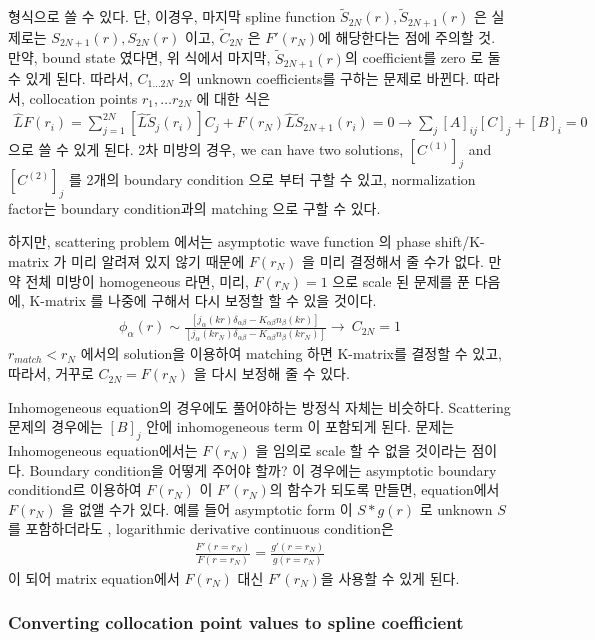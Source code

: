 \documentclass[10pt]{article}
\newcommand{\bea}{\begin{eqnarray}}
\newcommand{\eea}{\end{eqnarray}}
\begin{document}
형식으로 쓸 수 있다. 단, 이경우, 마지막 
spline function
$\tilde{S}_{2N}(r), \tilde{S}_{2N+1}(r)$ 은 
실제로는 $S_{2N+1}(r), S_{2N}(r)$ 이고,
$\tilde{C}_{2N}$ 은 $F'(r_N)$에 해당한다는 점에 주의할 것. 만약, bound state
였다면, 위 식에서 마지막, $\tilde{S}_{2N+1}(r)$의 coefficient를 zero
로 둘 수 있게 된다. 따라서, $C_{1\dots 2N}$ 의 unknown
coefficients를 구하는 문제로 바뀐다.
따라서, collocation points $r_1,\dots r_{2N}$ 에 대한 식은
\bea
\hat{L}F(r_i)=\sum_{j=1}^{2N}[\hat{L}\tilde{S}_j(r_i)]C_j
              +F(r_N)\hat{L}\tilde{S}_{2N+1}(r_i)=0
\to \sum_j [A]_{ij}[C]_j +[B]_i=0  
\eea
으로 쓸 수 있게 된다. 2차 미방의 경우, we can have two solutions,
$[C^{(1)}]_j$ and $[C^{(2)}]_j$ 를 2개의 boundary condition
으로 부터 구할 수 있고, normalization factor는 boundary condition과의
matching 으로 구할 수 있다.

하지만, scattering problem 에서는 asymptotic wave function 
의  phase shift/K-matrix 가
미리 알려져 있지 않기 때문에 $F(r_N)$ 을 미리 결정해서 줄 수가 없다. 
만약 전체 미방이 homogeneous 라면, 미리, $F(r_N)=1$ 으로
scale 된 문제를 푼 다음에, K-matrix 를 나중에 구해서 다시 보정할 할 수 있을 것이다. 
\bea
\phi_{\alpha}(r)\sim \frac{[j_\alpha(kr)\delta_{\alpha\beta}
                    -K_{\alpha\beta} n_\beta(kr)]}
                    {[j_\alpha(kr_N)\delta_{\alpha\beta}
                    -K_{\alpha\beta} n_\beta(kr_N)]}
                    \to\ C_{2N}=1
\eea
$r_{match}<r_N$ 에서의 solution을 이용하여 matching 
하면 K-matrix를 결정할 수 있고, 따라서, 거꾸로 $C_{2N}=F(r_N)$ 을 다시 
보정해 줄 수 있다.     

Inhomogeneous equation의 경우에도 풀어야하는 방정식 자체는 비슷하다. 
Scattering 문제의 경우에는 $[B]_j$ 안에 inhomogeneous term 이 포함되게 된다. 
문제는 Inhomogeneous equation에서는 $F(r_N)$ 을 임의로 
scale 할 수 없을 것이라는 점이다. 
Boundary condition을 어떻게 주어야 할까? 이 경우에는 
asymptotic boundary conditiond르 이용하여 $F(r_N)$ 이 
$F'(r_N)$의 함수가 되도록 만들면, equation에서 $F(r_N)$ 을 없앨 수가 있다.  
예를 들어 asymptotic form 이 $S*g(r)$ 로 unknown $S$ 를 포함하더라도 ,
logarithmic derivative continuous condition은 
\bea 
\frac{F'(r=r_N)}{F(r=r_N)}=\frac{g'(r=r_N)}{g(r=r_N)}
\eea 
이 되어 matrix equation에서 $F(r_N)$ 대신 $F'(r_N)$을 사용할 수 있게 된다. 

\subsubsection{Converting collocation point values to spline coefficient}
\end{document}
